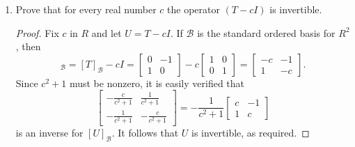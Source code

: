\begin{enumerate}
\item Prove that for every real number $c$ the operator $(T - cI)$ is
  invertible.
  \begin{proof}
    Fix $c$ in $R$ and let $U = T - cI$. If $\mathcal{B}$ is the
    standard ordered basis for $R^2$, then
    \begin{equation*}
      [U]_{\mathcal{B}} = [T]_{\mathcal{B}} - cI
      =
      \begin{bmatrix}
        0 & -1 \\
        1 & 0
      \end{bmatrix}
      - c
      \begin{bmatrix}
        1 & 0 \\
        0 & 1
      \end{bmatrix}
      =
      \begin{bmatrix}
        -c & -1 \\
        1 & -c
      \end{bmatrix}.
    \end{equation*}
    Since $c^2 + 1$ must be nonzero, it is easily verified that
    \begin{equation*}
      \begin{bmatrix}
        -\frac{c}{c^2 + 1} & \frac1{c^2 + 1} \\[3pt]
        -\frac1{c^2 + 1} & -\frac{c}{c^2 + 1}
      \end{bmatrix}
      = -\frac1{c^2 + 1}
      \begin{bmatrix}
        c & -1 \\
        1 & c
      \end{bmatrix}
    \end{equation*}
    is an inverse for $[U]_{\mathcal{B}}$. It follows that $U$ is
    invertible, as required.
  \end{proof}


\end{enumerate}
